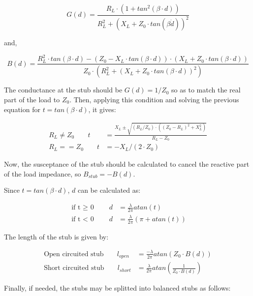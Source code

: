 \begin{equation}
G(d) = \frac{R_L \cdot (1 + tan^2(\beta \cdot d))}{R_L^2 + (X_L + Z_0\cdot tan(\beta \dot d))^2}
\end{equation}

\noindent and,

\begin{equation}
B(d) = \frac{R_L^2\cdot tan(\beta \cdot d) - (Z_0 - X_L\cdot tan(\beta \cdot d))\cdot (X_L + Z_0\cdot tan(\beta \cdot d))}{Z_0 \cdot (R_L^2 + (X_L + Z_0\cdot tan(\beta \cdot d))^2)}
\end{equation}

The conductance at the stub should be $G(d) = 1/Z_0$ so as to match the real part of the load to $Z_0$. Then, applying this condition and solving the previous equation for $t = tan(\beta \cdot d)$, it gives:

\begin{align}
R_L \neq Z_0 \;\;\;\;\;\;\;  t & = \frac{X_L \pm \sqrt{(R_L/Z_0) \cdot ((Z_0 - R_L)^2 + X_L^2)}}{R_L - Z_0} \\
R_L == Z_0 \;\;\;\;\;\;\;  t & = -X_L/(2\cdot Z_0)
\end{align}

\noindent Now, the susceptance of the stub should be calculated to cancel the reactive part of the load impedance, so $B_{stub} = -B(d)$.

\noindent Since $t=tan(\beta \cdot d)$, $d$ can be calculated as:

\begin{align}
\text{if t $\geq$ 0}\;\;\;\;\;\;\;  d & = \frac{\lambda}{2\pi} atan(t) \\
\text{if t $<$ 0}\;\;\;\;\;\;\;  d & = \frac{\lambda}{2\pi} (\pi + atan(t))
\end{align}

\noindent The length of the stub is given by:

\begin{align}
\text{Open circuited stub} \;\;\;\;\;\;\;  l_{open} & = \frac{-\lambda}{2\pi} atan\left(Z_0\cdot B(d)\right)  \\
\text{Short circuited stub}\;\;\;\;\;\;\;  l_{short} & = \frac{\lambda}{2\pi} atan\left(\frac{1}{Z_0\cdot B(d)}\right)
\end{align}

\noindent Finally, if needed, the stubs may be splitted into balanced stubs as follows:

